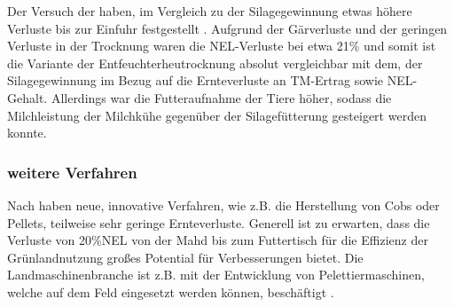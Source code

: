%
%
Der Versuch der \HBLFA haben, im Vergleich zu der Silagegewinnung etwas höhere Verluste bis zur Einfuhr festgestellt \parencite{gruber2015einfluss}. 
Aufgrund der Gärverluste und der geringen Verluste in der Trocknung waren die \ac{NEL}-Verluste bei etwa 21\% und somit ist die Variante der Entfeuchterheutrocknung absolut vergleichbar mit dem, der Silagegewinnung \parencite[30]{fritz2018wirtschaftliche} im Bezug auf die Ernteverluste an \ac{TM}-Ertrag sowie \ac{NEL}-Gehalt.
Allerdings war die Futteraufnahme der Tiere höher, sodass die Milchleistung der Milchkühe gegenüber der Silagefütterung gesteigert werden konnte.


\subsubsection{weitere Verfahren}
\label{subsub:Peletts}
Nach \textcite[12f]{engel2013protein} haben neue, innovative Verfahren, wie z.B. die Herstellung von Cobs oder Pellets, teilweise sehr geringe Ernteverluste.
Generell ist zu erwarten, dass die Verluste von 20\%\ac{NEL} von der Mahd bis zum Futtertisch für die Effizienz der Grünlandnutzung großes Potential für Verbesserungen bietet.
Die Landmaschinenbranche ist z.B. mit der Entwicklung von Pelettiermaschinen, welche auf dem Feld eingesetzt werden können, beschäftigt \parencite[9]{schrammcrop}.

